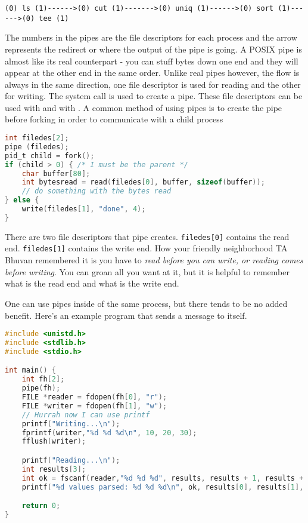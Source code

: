 \begin{verbatim}
(0) ls (1)------>(0) cut (1)------->(0) uniq (1)------>(0) sort (1)------>(0) tee (1)
\end{verbatim}

The numbers in the pipes are the file descriptors for each process and the arrow represents the redirect or where the output of the pipe is going.
A POSIX pipe is almost like its real counterpart - you can stuff bytes down one end and they will appear at the other end in the same order.
Unlike real pipes however, the flow is always in the same direction, one file descriptor is used for reading and the other for writing.
The  system call is used to create a pipe.
These file descriptors can be used with  and with . A common method of using pipes is to create the pipe before forking in order to communicate with a child process

\begin{lstlisting}[language=C]
int filedes[2];
pipe (filedes);
pid_t child = fork();
if (child > 0) { /* I must be the parent */
    char buffer[80];
    int bytesread = read(filedes[0], buffer, sizeof(buffer));
    // do something with the bytes read
} else {
	write(filedes[1], "done", 4);
}
\end{lstlisting}

There are two file descriptors that pipe creates.
\texttt{filedes[0]} contains the read end.
\texttt{filedes[1]} contains the write end.
How your friendly neighborhood TA Bhuvan remembered it is you have to \textit{read before you can write, or reading comes before writing}.
You can groan all you want at it, but it is helpful to remember what is the read end and what is the write end.

One can use pipes inside of the same process, but there tends to be no added benefit.
Here's an example program that sends a message to itself.

\begin{lstlisting}[language=C]
#include <unistd.h>
#include <stdlib.h>
#include <stdio.h>

int main() {
    int fh[2];
    pipe(fh);
    FILE *reader = fdopen(fh[0], "r");
    FILE *writer = fdopen(fh[1], "w");
    // Hurrah now I can use printf
    printf("Writing...\n");
    fprintf(writer,"%d %d %d\n", 10, 20, 30);
    fflush(writer);

    printf("Reading...\n");
    int results[3];
    int ok = fscanf(reader,"%d %d %d", results, results + 1, results + 2);
    printf("%d values parsed: %d %d %d\n", ok, results[0], results[1], results[2]);

    return 0;
}
\end{lstlisting}

